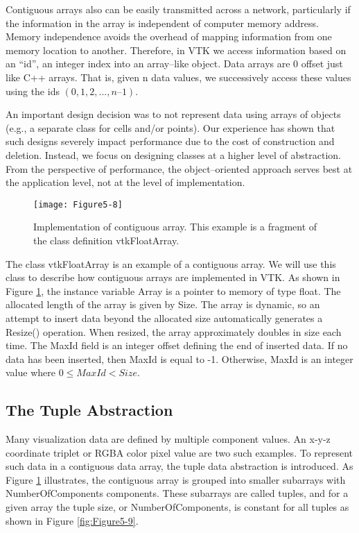 Contiguous arrays also can be easily transmitted across a network, particularly if the information in the array is independent of computer memory address. Memory independence avoids the overhead of mapping information from one memory location to another. Therefore, in VTK we access information based on an ``id'', an integer index into an array--like object. Data arrays are 0 offset just like C++ arrays. That is, given n data values, we successively access these values using the ids $(0, 1, 2, ..., n – 1)$.

An important design decision was to not represent data using arrays of objects (e.g., a separate class for cells and/or points). Our experience has shown that such designs severely impact performance due to the cost of construction and deletion. Instead, we focus on designing classes at a higher level of abstraction. From the perspective of performance, the object--oriented approach serves best at the application level, not at the level of implementation.

\begin{figure}[!htb]
	\centering
	\texttt{[image: Figure5-8]}
	\caption{Implementation of contiguous array. This example is a fragment of the class definition vtkFloatArray.}
	\label{fig:Figure5-8}
\end{figure}

The class vtkFloatArray is an example of a contiguous array. We will use this class to describe how contiguous arrays are implemented in VTK. As shown in Figure \ref{fig:Figure5-8}, the instance variable Array is a pointer to memory of type float. The allocated length of the array is given by Size. The array is dynamic, so an attempt to insert data beyond the allocated size automatically generates a Resize() operation. When resized, the array approximately doubles in size each time. The MaxId field is an integer offset defining the end of inserted data. If no data has been inserted, then MaxId is equal to -1. Otherwise, MaxId is an integer value where $0 \leq MaxId < Size$.

\subsection{The Tuple Abstraction}

Many visualization data are defined by multiple component values. An x-y-z coordinate triplet or RGBA color pixel value are two such examples. To represent such data in a contiguous data array, the tuple data abstraction is introduced. As Figure \ref{fig:Figure5-8} illustrates, the contiguous array is grouped into smaller subarrays with NumberOfComponents components. These subarrays are called tuples, and for a given array the tuple size, or NumberOfComponents, is constant for all tuples as shown in Figure \ref{fig:Figure5-9}.

